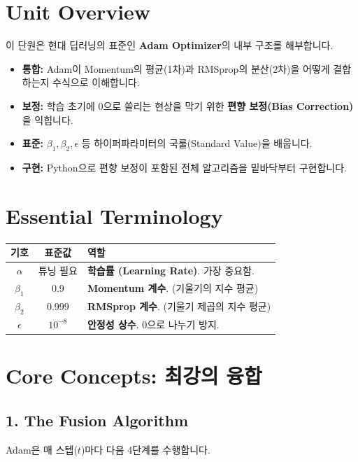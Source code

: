 \documentclass[11pt,a4paper]{book}
\theoremstyle{definition}
\begin{document}
\section{Unit Overview}
\begin{summarybox}[title={핵심 목표}]
이 단원은 현대 딥러닝의 표준인 \textbf{Adam Optimizer}의 내부 구조를 해부합니다.
\begin{itemize}
    \item \textbf{통합:} Adam이 Momentum의 평균(1차)과 RMSprop의 분산(2차)을 어떻게 결합하는지 수식으로 이해합니다.
    \item \textbf{보정:} 학습 초기에 0으로 쏠리는 현상을 막기 위한 \textbf{편향 보정(Bias Correction)}을 익힙니다.
    \item \textbf{표준:} $\beta_1, \beta_2, \epsilon$ 등 하이퍼파라미터의 국룰(Standard Value)을 배웁니다.
    \item \textbf{구현:} Python으로 편향 보정이 포함된 전체 알고리즘을 밑바닥부터 구현합니다.
\end{itemize}
\end{summarybox}

\section{Essential Terminology}
\begin{center}
\begin{tabular}{|c|c|l|}
\hline
\textbf{기호} & \textbf{표준값} & \textbf{역할} \\ \hline
$\alpha$ & 튜닝 필요 & \textbf{학습률 (Learning Rate)}. 가장 중요함. \\ \hline
$\beta_1$ & 0.9 & \textbf{Momentum 계수}. (기울기의 지수 평균) \\ \hline
$\beta_2$ & 0.999 & \textbf{RMSprop 계수}. (기울기 제곱의 지수 평균) \\ \hline
$\epsilon$ & $10^{-8}$ & \textbf{안정성 상수}. 0으로 나누기 방지. \\ \hline
\end{tabular}
\end{center}

\section{Core Concepts: 최강의 융합}

\subsection{1. The Fusion Algorithm}
Adam은 매 스텝($t$)마다 다음 4단계를 수행합니다.
\end{document}
